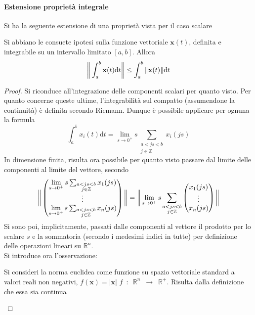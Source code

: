 \documentclass[10pt]{article}
\theoremstyle{plain}
\begin{document}
\paragraph{Estensione proprietà integrale}
Si ha la seguente estensione di una proprietà vista per il caso scalare
\begin{prop}
Si abbiano le consuete ipotesi sulla funzione vettoriale $\mathbf{x}(t)$, definita e integrabile su un intervallo limitato $[a,b]$. Allora
\[\bigg{\|}\int_{a}^{b}\mathbf{x}(t)\textrm{d}t\bigg{\|} \leq \int_{a}^{b}\|\mathbf{x}(t)\|\textrm{d}t\]
\end{prop}
\begin{proof}
Si riconduce all'integrazione delle componenti scalari per quanto visto. Per quanto concerne queste ultime, l'integrabilità sul compatto (assumendone la continuità) è definita secondo Riemann. Dunque è possibile applicare per ognuna la formula
\[\int_{a}^{b}x_i(t)\textrm{d}t = \lim\limits_{s \rightarrow 0^+}s \sum_{\displaystyle \substack{a < js < b \\ j \in \mathbb{Z}}} x_i(js)\]
In dimensione finita, risulta ora possibile per quanto visto passare dal limite delle componenti al limite del vettore, secondo 
\[\bigg{\|}\begin{pmatrix}
\lim\limits_{s \rightarrow 0^+}s \sum_{\substack{a < js < b \\ j \in \mathbb{Z}}} x_1(js) \\
\vdots \\
\lim\limits_{s \rightarrow 0^+}s \sum_{\substack{a < js < b \\ j \in \mathbb{Z}}} x_n(js)
\end{pmatrix}\bigg{\|} = \bigg{\|}\lim\limits_{s \rightarrow 0^+}s \sum_{\displaystyle \substack{a < js < b \\ j \in \mathbb{Z}}} \begin{pmatrix}
x_1(js)\\
\vdots\\
x_n(js)
\end{pmatrix}\bigg{\|}\]
Si sono poi, implicitamente, passati dalle componenti al vettore il prodotto per lo scalare $s$ e la sommatoria (secondo i medesimi indici in tutte) per definizione delle operazioni lineari su $\mathbb{R}^n$.
\\Si introduce ora l'osservazione:
\begin{oss}
Si consideri la norma euclidea come funzione su spazio vettoriale standard a valori reali non negativi, $f(\mathbf{x}) = |\mathbf{x}|$ $f \enspace : \enspace \mathbb{R}^n \enspace \rightarrow \enspace \mathbb{R}^+$. Risulta dalla definizione che essa sia continua

\end{oss}
\end{proof}
\end{document}
